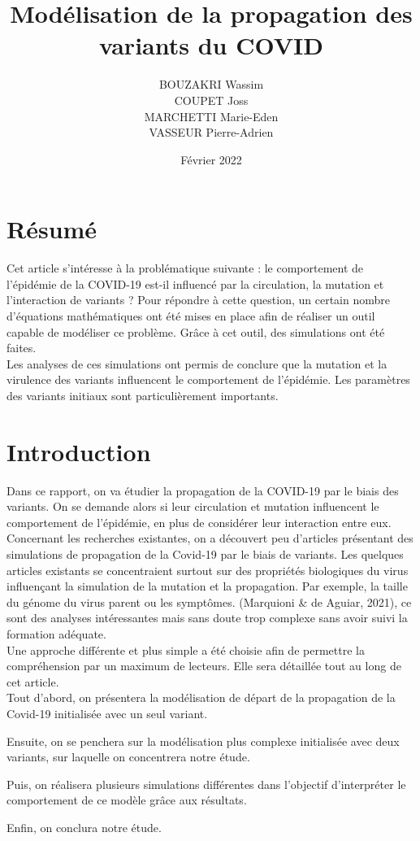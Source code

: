 \documentclass{article}
\title{Modélisation de la propagation des variants du COVID}
\author{BOUZAKRI Wassim \\COUPET Joss \\MARCHETTI Marie-Eden \\VASSEUR Pierre-Adrien}
\date{Février 2022}
\begin{document}
\maketitle

\section{Résumé}

Cet article s'intéresse à la problématique suivante : le comportement de l'épidémie de la COVID-19 est-il influencé par la circulation, la mutation et l'interaction de variants ?
Pour répondre à cette question, un certain nombre d'équations mathématiques ont été mises en place afin de réaliser un outil capable de modéliser ce problème. Grâce à cet outil, des simulations ont été faites. \\
Les analyses de ces simulations ont permis de conclure que la mutation et la virulence des variants influencent le comportement de l'épidémie. Les paramètres des variants initiaux sont particulièrement importants.

\section{Introduction}

Dans ce rapport, on va étudier la propagation de la COVID-19 par le biais des variants.
On se demande alors si leur circulation et mutation influencent le comportement de l'épidémie, en plus de considérer leur interaction entre eux.\\
\noindent
Concernant les recherches existantes, on a découvert peu d'articles présentant des simulations de propagation de la Covid-19 par le biais de variants.
Les quelques articles existants se concentraient surtout sur des propriétés biologiques du virus influençant la simulation de la mutation et la propagation.
Par exemple, la taille du génome du virus parent ou les symptômes. (Marquioni \& de Aguiar, 2021), ce sont des analyses intéressantes mais sans doute trop complexe sans avoir suivi la formation adéquate.\\
\noindent
Une approche différente et plus simple a été choisie afin de permettre la compréhension par un maximum de lecteurs. Elle sera détaillée tout au long de cet article.\\
\noindent
Tout d'abord, on présentera la modélisation de départ de la propagation de la Covid-19 initialisée avec un seul variant. \par
\noindent
Ensuite, on se penchera sur la modélisation plus complexe initialisée avec deux variants, sur laquelle on concentrera notre étude.\par
\noindent
Puis, on réalisera plusieurs simulations différentes dans l'objectif d'interpréter le comportement de ce modèle grâce aux résultats.\par
\noindent
Enfin, on conclura notre étude.\\
\end{document}
